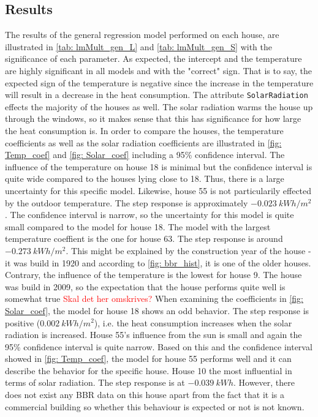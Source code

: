 \subsection{Results}
The results of the general regression model performed on each house, are illustrated in \cref{tab: lmMult_gen_L} and \cref{tab: lmMult_gen_S} with the significance of each parameter. As expected, the intercept and the temperature are highly significant in all models and with the "correct" sign. That is to say, the expected sign of the temperature is negative since the increase in the temperature will result in a decrease in the heat consumption. The attribute \texttt{SolarRadiation} effects the majority of the houses as well. The solar radiation warms the house up through the windows, so it makes sense that this has significance for how large the heat consumption is. In order to compare the houses, the temperature coefficients as well as the solar radiation coefficients are illustrated in \cref{fig: Temp_coef} and \cref{fig: Solar_coef} including a 95\% confidence interval. The influence of the temperature on house 18 is minimal but the confidence interval is quite wide compared to the houses lying close to 18. Thus, there is a large uncertainty for this specific model. Likewise, house 55 is not particularily effected by the outdoor temperature. The step response is approximately $-0.023 \ kWh/m^2$. The confidence interval is narrow, so the uncertainty for this model is quite small compared to the model for house 18. The model with the largest temperature coeffient is the one for house 63. The step response is around $-0.273 \ kWh/m^2$. This might be explained by the construction year of the house - it was build in 1920 and according to \cref{fig: bbr_hist}, it is one of the older houses. Contrary, the influence of the temperature is the lowest for house 9. The house was build in 2009, so the expectation that the house performs quite well is somewhat true \textcolor{red}{Skal det her omskrives?} When examining the coefficients in \cref{fig: Solar_coef}, the model for house 18 shows an odd behavior. The step response is positive ($0.002 \ kWh/m^2$), i.e. the heat consumption increases when the solar radiation is increased. House 55's influence from the sun is small and again the 95\% confidence interval is quite narrow. Based on this and the confidence interval showed in \cref{fig: Temp_coef}, the model for house 55 performs well and it can describe the behavior for the specific house. House 10 the most influential in terms of solar radiation. The step response is at $-0.039 \ kWh$. However, there does not exist any BBR data on this house apart from the fact that it is a commercial building so whether this behaviour is expected or not is not known.\\ 
